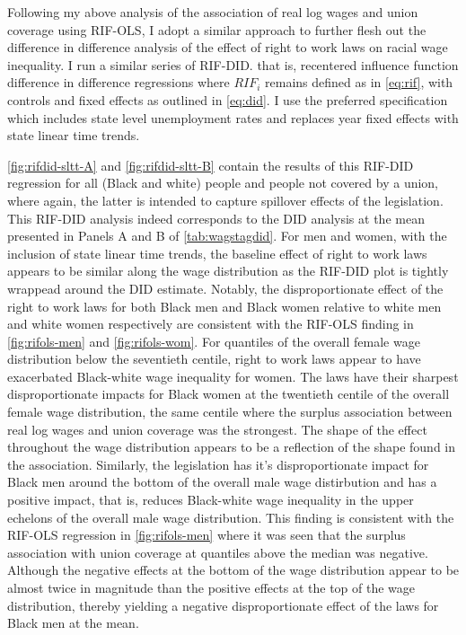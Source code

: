 \documentclass[11pt]{article}
\begin{document}
Following my above analysis of the association of real log wages and union coverage using RIF-OLS, I adopt a similar approach to further flesh out the difference in difference analysis of the effect of right to work laws on racial wage inequality. I run a similar series of RIF-DID. that is, recentered influence function difference in difference regressions where $RIF_i$ remains defined as in \autoref{eq:rif}, with controls and fixed effects as outlined in \autoref{eq:did}. I use the preferred specification which includes state level unemployment rates and replaces year fixed effects with state linear time trends. 

\autoref{fig:rifdid-sltt-A} and \autoref{fig:rifdid-sltt-B} contain the results of this RIF-DID regression for all (Black and white) people and people not covered by a union, where again, the latter is intended to capture spillover effects of the legislation. This RIF-DID analysis indeed corresponds to the DID analysis at the mean presented in Panels A and B of \autoref{tab:wagstagdid}. For men and women, with the inclusion of state linear time trends, the baseline effect of right to work laws appears to be similar along the wage distribution as the RIF-DID plot is tightly wrappead around the DID estimate. Notably, the disproportionate effect of the right to work laws for both Black men and Black women relative to white men and white women respectively are consistent with the RIF-OLS finding in \autoref{fig:rifols-men} and \autoref{fig:rifols-wom}. For quantiles of the overall female wage distribution below the seventieth centile, right to work laws appear to have exacerbated Black-white wage inequality for women. The laws have their sharpest disproportionate impacts for Black women at the twentieth centile of the overall female wage distribution, the same centile where the surplus association between real log wages and union coverage was the strongest. The shape of the effect throughout  the wage distribution appears to be a reflection of the shape found in the association. Similarly, the legislation has it's disproportionate impact for Black men around the bottom of the overall male wage distirbution and has a positive impact, that is, reduces Black-white wage inequality in the upper echelons of the overall male wage distribution. This finding is consistent with the RIF-OLS regression in \autoref{fig:rifols-men} where it was seen that the surplus association with union coverage at quantiles above the median was negative. Although the negative effects at the bottom of the wage distribution appear to be almost twice in magnitude than the positive effects at the top of the wage distribution, thereby yielding a negative disproportionate effect of the laws for Black men at the mean. 
\end{document}
